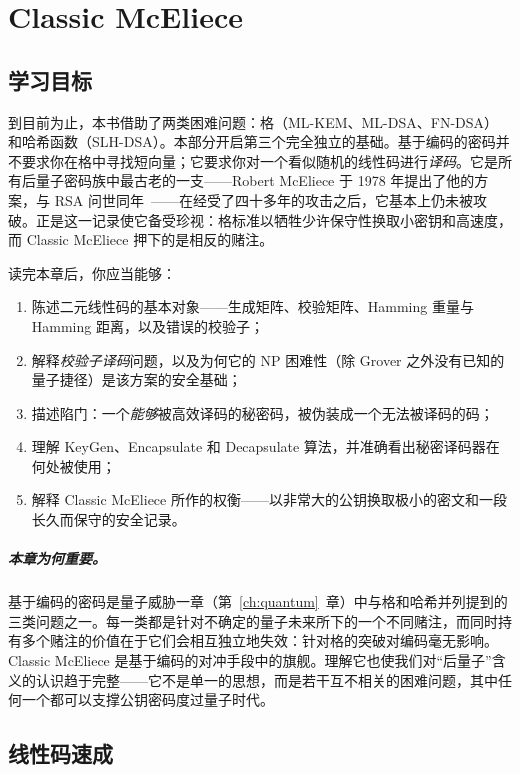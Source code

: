 \chapter{Classic McEliece}
\label{ch:mceliece}

\section{学习目标}

到目前为止，本书借助了两类困难问题：格（ML-KEM、ML-DSA、FN-DSA）和哈希函数（SLH-DSA）。本部分开启第三个完全独立的基础。基于编码的密码并不要求你在格中寻找短向量；它要求你对一个看似随机的线性码进行\emph{译码}。它是所有后量子密码族中最古老的一支——Robert McEliece 于 1978 年提出了他的方案，与 RSA 问世同年~\cite{mceliece1978}——在经受了四十多年的攻击之后，它基本上仍未被攻破。正是这一记录使它备受珍视：格标准以牺牲少许保守性换取小密钥和高速度，而 Classic McEliece 押下的是相反的赌注。

读完本章后，你应当能够：

\begin{enumerate}
  \item 陈述二元线性码的基本对象——生成矩阵、校验矩阵、Hamming 重量与 Hamming 距离，以及错误的校验子；
  \item 解释\emph{校验子译码}问题，以及为何它的 NP 困难性（除 Grover 之外没有已知的量子捷径）是该方案的安全基础；
  \item 描述陷门：一个\emph{能够}被高效译码的秘密码，被伪装成一个无法被译码的码；
  \item 理解 KeyGen、Encapsulate 和 Decapsulate 算法，并准确看出秘密译码器在何处被使用；
  \item 解释 Classic McEliece 所作的权衡——以非常大的公钥换取极小的密文和一段长久而保守的安全记录。
\end{enumerate}

\paragraph{本章为何重要。}
基于编码的密码是量子威胁一章（第~\ref{ch:quantum}~章）中与格和哈希并列提到的三类问题之一。每一类都是针对不确定的量子未来所下的一个不同赌注，而同时持有多个赌注的价值在于它们会相互独立地失效：针对格的突破对编码毫无影响。Classic McEliece 是基于编码的对冲手段中的旗舰。理解它也使我们对“后量子”含义的认识趋于完整——它不是单一的思想，而是若干互不相关的困难问题，其中任何一个都可以支撑公钥密码度过量子时代。

\section{线性码速成}

